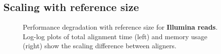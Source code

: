 \subsection{Scaling with reference size} \label{SEEDsec:eval-refsize}

\begin{figure}[H]
    \centering
  \caption[Performance scaling with reference size (short reads)]{Performance
  degradation with reference size for \textbf{Illumina reads}. Log-log plots of
  total alignment time (left) and memory usage (right) show the scaling
  difference between aligners.}
  \label{SEEDfig:illumina_scaling_with_genomesize}
\end{figure}

